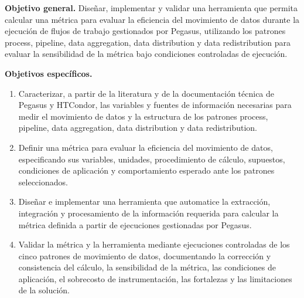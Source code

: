 \textbf{Objetivo general.} Diseñar, implementar y validar una herramienta que permita calcular una métrica para evaluar la eficiencia del movimiento de datos durante la ejecución de flujos de trabajo gestionados por Pegasus, utilizando los patrones process, pipeline, data aggregation, data distribution y data redistribution para evaluar la sensibilidad de la métrica bajo condiciones controladas de ejecución.

\textbf{Objetivos específicos.}
\begin{enumerate}
\item Caracterizar, a partir de la literatura y de la documentación técnica de Pegasus y HTCondor, las variables y fuentes de información necesarias para medir el movimiento de datos y la estructura de los patrones process, pipeline, data aggregation, data distribution y data redistribution.
\item Definir una métrica para evaluar la eficiencia del movimiento de datos, especificando sus variables, unidades, procedimiento de cálculo, supuestos, condiciones de aplicación y comportamiento esperado ante los patrones seleccionados.
\item Diseñar e implementar una herramienta que automatice la extracción, integración y procesamiento de la información requerida para calcular la métrica definida a partir de ejecuciones gestionadas por Pegasus.
\item Validar la métrica y la herramienta mediante ejecuciones controladas de los cinco patrones de movimiento de datos, documentando la corrección y consistencia del cálculo, la sensibilidad de la métrica, las condiciones de aplicación, el sobrecosto de instrumentación, las fortalezas y las limitaciones de la solución.
\end{enumerate}
